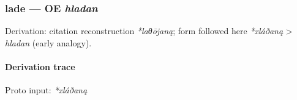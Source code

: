 \documentclass[
  british,
  a4paper,
]{article}
\begin{document}
\subsubsection{\texorpdfstring{lade --- OE
\emph{hladan}}{lade --- OE hladan}}\label{lade-oe-hladan}

Derivation: citation reconstruction \emph{*laθōjaną}; form followed here
\emph{*xláðaną} \textgreater{} \emph{hladan} (early analogy).

\paragraph{Derivation trace}\label{derivation-trace-97}

Proto input: \emph{*xláðaną}

\begingroup
\setlength{\fboxsep}{6pt}
\end{document}
